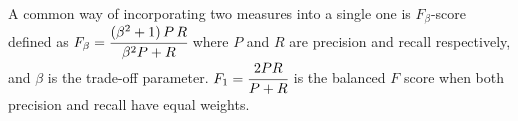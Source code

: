 A common way of incorporating two measures into a single one is $F_\beta$-score
defined as $F_\beta = \cfrac{(\beta^2 +1)\, P \, R}{\beta^2 P + R}$ where 
$P$ and $R$ are precision and recall respectively, and $\beta$ is the trade-off
parameter. $F_1 = \cfrac{2PR}{P + R}$ is the balanced $F$ score when both 
precision and recall have equal weights.